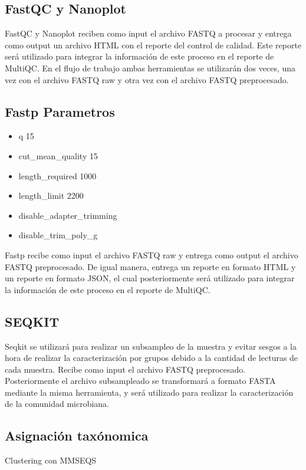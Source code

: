 \subsection{FastQC y Nanoplot}
FastQC y Nanoplot reciben como input el archivo FASTQ a procesar y entrega como output un archivo HTML con el reporte del control de calidad. Este reporte será utilizado para integrar la información de este proceso en el reporte de MultiQC.
En el flujo de trabajo ambas herramientas se utilizarán dos veces, una vez con el archivo FASTQ raw y otra vez con el archivo FASTQ preprocesado.
\subsection{Fastp Parametros}

\begin{itemize}
    \item q 15
    \item cut\_mean\_quality 15
    \item length\_required 1000
    \item length\_limit 2200
    \item disable\_adapter\_trimming
    \item disable\_trim\_poly\_g
\end{itemize}

Fastp recibe como input el archivo FASTQ raw y entrega como output el archivo FASTQ preprocesado. De igual manera, entrega un reporte en formato HTML y un reporte en formato JSON, el cual posteriormente será utilizado para integrar la información de este proceso en el reporte de MultiQC.

\subsection{SEQKIT}
Seqkit se utilizará para realizar un subsampleo de la muestra y evitar sesgos a la hora de realizar la caracterización por grupos debido a la cantidad de lecturas de cada muestra. Recibe como input el archivo FASTQ preprocesado.
Posteriormente el archivo subsampleado se transformará a formato FASTA mediante la misma herramienta, y será utilizado para realizar la caracterización de la comunidad microbiana.



\subsection{Asignación taxónomica}
Clustering con MMSEQS
